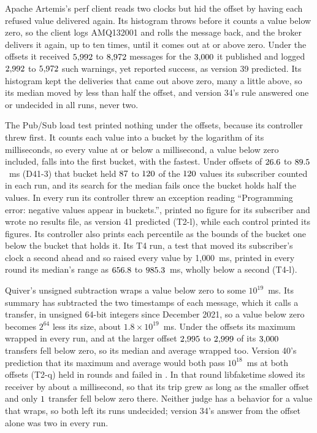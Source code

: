 \documentclass[10pt,journal,onecolumn]{IEEEtran}
\begin{document}
Apache Artemis's perf client reads two clocks but hid the offset by having each refused value
delivered again. Its histogram throws before it counts a value below zero, so the client logs
AMQ132001 and rolls the message back, and the broker delivers it again, up to ten times, until it
comes out at or above zero. Under the offsets it received $5{,}992$ to
$8{,}972$ messages for the $3{,}000$ it published and logged
$2{,}992$ to $5{,}972$ such warnings, yet reported success, as version
39 predicted. Its histogram kept the deliveries that came out above zero, many a little above, so
its median moved by less than half the offset, and version 34's rule answered one or undecided in
all \toolsArtemisRunsWord{} runs, never two.

The Pub/Sub load test printed nothing under the offsets, because its controller threw first. It
counts each value into a bucket by the logarithm of its milliseconds, so every value at or below a
millisecond, a value below zero included, falls into the first bucket, with the fastest. Under
offsets of $26.6$ to $89.5$~ms (D41-3) that bucket held
$87$ to $120$ of the $120$ values its subscriber
counted in each run, and its search for the median fails once the bucket holds half the values. In
every run its controller threw an exception reading ``Programming error: negative values appear in
buckets.'', printed no figure for its subscriber and wrote no results file, as version 41 predicted
(T2-l), while each control printed its figures. Its controller also prints each percentile as the
bounds of the bucket one below the bucket that holds it. Its T4 run, a test that moved its
subscriber's clock a second ahead and so raised every value by 1{,}000~ms, printed in every round
its median's range as $656.8$ to $985.3$~ms, wholly below a second
(T4-l).

Quiver's unsigned subtraction wraps a value below zero to some $10^{19}$~ms. Its summary has
subtracted the two timestamps of each message, which it calls a transfer, in unsigned 64-bit
integers since December 2021, so a value below zero becomes $2^{64}$ less its size, about
$1.8\times10^{19}$~ms. Under the offsets its maximum wrapped in every run, and at the larger offset
$2{,}995$ to $2{,}999$ of its $3{,}000$ transfers fell
below zero, so its median and average wrapped too. Version 40's prediction that its maximum and
average would both pass $10^{18}$~ms at both offsets (T2-q) held in \toolsQuiverHeldWord{} rounds
and failed in \toolsQuiverFailedWord{}. In that round libfaketime slowed its receiver by about a
millisecond, so that its trip grew as long as the smaller offset and only $1$
transfer fell below zero there. Neither judge has a behavior for a value that wraps, so both left
its runs undecided; version 34's answer from the offset alone was two in every run.
\end{document}
